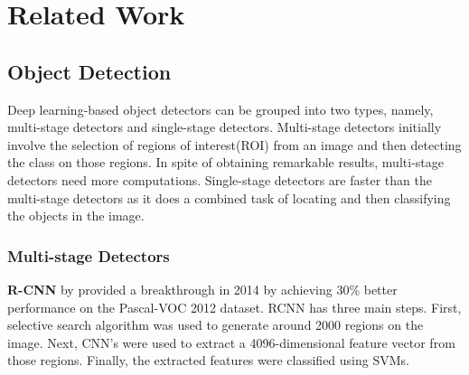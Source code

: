 \documentclass[thesis]{mas_proposal}
\begin{document}


\section{Related Work}
        

\subsection{Object Detection}
Deep learning-based object detectors can be grouped into two types, namely, multi-stage detectors and single-stage detectors. Multi-stage detectors initially involve the selection of regions of interest(ROI) from an image and then detecting the class on those regions. In spite of obtaining remarkable results, multi-stage detectors need more computations. Single-stage detectors are faster than the multi-stage detectors as it does a combined task of locating and then classifying the objects in the image. 

\subsubsection{Multi-stage Detectors}

\textbf{R-CNN} by \citet{girshick2014rich} provided a breakthrough in 2014 by achieving 30\% better performance on the Pascal-VOC 2012 dataset. RCNN has three main steps. First, selective search algorithm was used to generate around 2000 regions on the image. Next, CNN's were used to extract a 4096-dimensional feature vector from those regions. Finally, the extracted features were classified using SVMs. 
\end{document}
